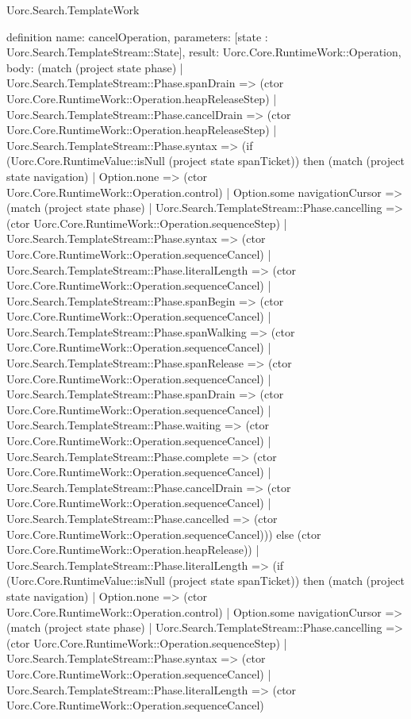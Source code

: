 \begin{lexlean}{Uorc.Search.TemplateWork}
\begin{semanticmodule}
definition{
  name: cancelOperation,
  parameters: [state : Uorc.Search.TemplateStream::State],
  result: Uorc.Core.RuntimeWork::Operation,
  body: (match (project state phase)
    | Uorc.Search.TemplateStream::Phase.spanDrain => (ctor Uorc.Core.RuntimeWork::Operation.heapReleaseStep)
    | Uorc.Search.TemplateStream::Phase.cancelDrain => (ctor Uorc.Core.RuntimeWork::Operation.heapReleaseStep)
    | Uorc.Search.TemplateStream::Phase.syntax => (if (Uorc.Core.RuntimeValue::isNull (project state spanTicket)) then (match (project state navigation)
      | Option.none => (ctor Uorc.Core.RuntimeWork::Operation.control)
      | Option.some navigationCursor => (match (project state phase)
        | Uorc.Search.TemplateStream::Phase.cancelling => (ctor Uorc.Core.RuntimeWork::Operation.sequenceStep)
        | Uorc.Search.TemplateStream::Phase.syntax => (ctor Uorc.Core.RuntimeWork::Operation.sequenceCancel)
        | Uorc.Search.TemplateStream::Phase.literalLength => (ctor Uorc.Core.RuntimeWork::Operation.sequenceCancel)
        | Uorc.Search.TemplateStream::Phase.spanBegin => (ctor Uorc.Core.RuntimeWork::Operation.sequenceCancel)
        | Uorc.Search.TemplateStream::Phase.spanWalking => (ctor Uorc.Core.RuntimeWork::Operation.sequenceCancel)
        | Uorc.Search.TemplateStream::Phase.spanRelease => (ctor Uorc.Core.RuntimeWork::Operation.sequenceCancel)
        | Uorc.Search.TemplateStream::Phase.spanDrain => (ctor Uorc.Core.RuntimeWork::Operation.sequenceCancel)
        | Uorc.Search.TemplateStream::Phase.waiting => (ctor Uorc.Core.RuntimeWork::Operation.sequenceCancel)
        | Uorc.Search.TemplateStream::Phase.complete => (ctor Uorc.Core.RuntimeWork::Operation.sequenceCancel)
        | Uorc.Search.TemplateStream::Phase.cancelDrain => (ctor Uorc.Core.RuntimeWork::Operation.sequenceCancel)
        | Uorc.Search.TemplateStream::Phase.cancelled => (ctor Uorc.Core.RuntimeWork::Operation.sequenceCancel))) else (ctor Uorc.Core.RuntimeWork::Operation.heapRelease))
    | Uorc.Search.TemplateStream::Phase.literalLength => (if (Uorc.Core.RuntimeValue::isNull (project state spanTicket)) then (match (project state navigation)
      | Option.none => (ctor Uorc.Core.RuntimeWork::Operation.control)
      | Option.some navigationCursor => (match (project state phase)
        | Uorc.Search.TemplateStream::Phase.cancelling => (ctor Uorc.Core.RuntimeWork::Operation.sequenceStep)
        | Uorc.Search.TemplateStream::Phase.syntax => (ctor Uorc.Core.RuntimeWork::Operation.sequenceCancel)
        | Uorc.Search.TemplateStream::Phase.literalLength => (ctor Uorc.Core.RuntimeWork::Operation.sequenceCancel)
}
\end{semanticmodule}
\end{lexlean}
